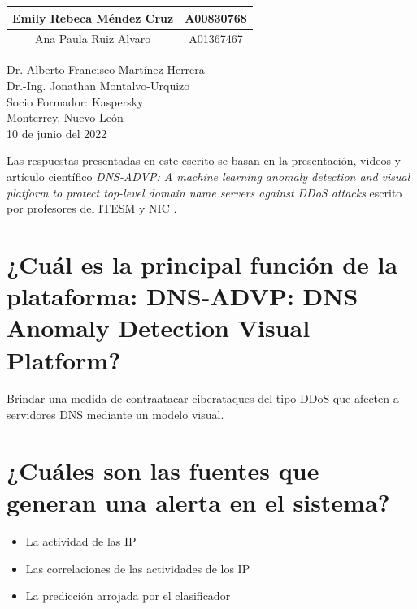 \documentclass{article}
\begin{document}
\begin{titlepage}
\begin{center}
\begin{table}[h!]
\begin{tabular}{ ||c|c|| }
                    \hline
                    Emily Rebeca Méndez Cruz & A00830768 \\
                    \hline
                    Ana Paula Ruiz Alvaro & A01367467 \\
                    \hline
                \end{tabular}
            \end{table}
            \vspace{0.7cm}
            \large Dr. Alberto Francisco Martínez Herrera \\ %
            \vspace{0.2cm}
            \large Dr.-Ing. Jonathan Montalvo-Urquizo \\ %
            \vspace{0.2cm}
            \large Socio Formador: Kaspersky \\
            \vspace{0.2cm}
            \large Monterrey, Nuevo León \\
            \vspace{0.2cm}
            \large 10 de junio del 2022 \\
            \vspace{1cm}
        \end{center}
    \end{titlepage}
    
    Las respuestas presentadas en este escrito se basan en la presentación, videos y artículo científico \emph{DNS-ADVP: A machine learning anomaly detection and visual platform to protect top-level domain name servers against DDoS attacks} escrito por profesores del ITESM y NIC \cite{trejo2019dns}.

    \section{¿Cuál es la principal función de la plataforma: DNS-ADVP: DNS Anomaly Detection Visual Platform?}

        Brindar una medida de contraatacar ciberataques del tipo DDoS que afecten a servidores DNS mediante un modelo visual.
    
    \section{¿Cuáles son las fuentes que generan una alerta en el sistema?}

        \begin{itemize}
            \item La actividad de las IP
            \item Las correlaciones de las actividades de los IP
            \item La predicción arrojada por el clasificador
        \end{itemize}
\end{document}
